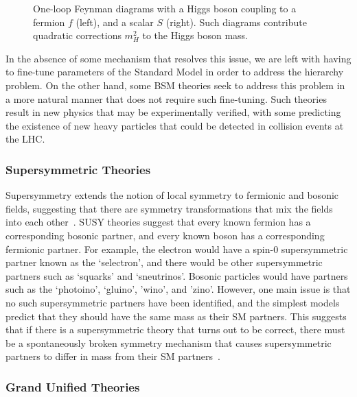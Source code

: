 \begin{figure}[htbp]
  \centering
  
  \caption{
    One-loop Feynman diagrams with a Higgs boson coupling to a fermion $f$ (left), and a scalar $S$ (right).
    Such diagrams contribute quadratic corrections $m_H^2$ to the Higgs boson mass.
  }
  \label{fig:higgsFeyn}
\end{figure}

In the absence of some mechanism that resolves this issue, we are left with having to fine-tune parameters of the Standard Model in order to address the hierarchy problem.
On the other hand, some BSM theories seek to address this problem in a more natural manner that does not require such fine-tuning.
Such theories result in new physics that may be experimentally verified, with some predicting the existence of new heavy particles that could be detected in collision events at the LHC.

\subsubsection{Supersymmetric Theories}

Supersymmetry extends the notion of local symmetry to fermionic and bosonic fields, suggesting that there are symmetry transformations that mix the fields into each other~\cite{Wess197452}.
SUSY theories suggest that every known fermion has a corresponding bosonic partner, and every known boson has a corresponding fermionic partner.
For example, the electron would have a spin-0 supersymmetric partner known as the `selectron', and there would be other supersymmetric partners such as `squarks' and `sneutrinos'.
Bosonic particles would have partners such as the `photoino', `gluino', 'wino', and 'zino'.
However, one main issue is that no such supersymmetric partners have been identified, and the simplest models predict that they should have the same mass as their SM partners.
This suggests that if there is a supersymmetric theory that turns out to be correct, there must be a spontaneously broken symmetry mechanism that causes supersymmetric partners to differ in mass from their SM partners~\cite{dine_2007}.

\subsubsection{Grand Unified Theories}

